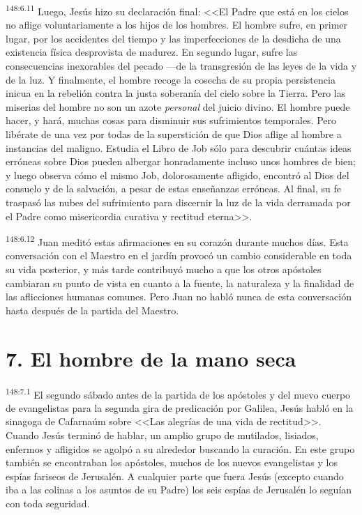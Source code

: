 \par 
\textsuperscript{148:6.11} Luego, Jesús hizo su declaración final: <<El Padre que está en los cielos no aflige voluntariamente a los hijos de los hombres. El hombre sufre, en primer lugar, por los accidentes del tiempo y las imperfecciones de la desdicha de una existencia física desprovista de madurez. En segundo lugar, sufre las consecuencias inexorables del pecado ---de la transgresión de las leyes de la vida y de la luz. Y finalmente, el hombre recoge la cosecha de su propia persistencia inicua en la rebelión contra la justa soberanía del cielo sobre la Tierra. Pero las miserias del hombre no son un azote \textit{personal} del juicio divino. El hombre puede hacer, y hará, muchas cosas para disminuir sus sufrimientos temporales. Pero libérate de una vez por todas de la superstición de que Dios aflige al hombre a instancias del maligno. Estudia el Libro de Job sólo para descubrir cuántas ideas erróneas sobre Dios pueden albergar honradamente incluso unos hombres de bien; y luego observa cómo el mismo Job, dolorosamente afligido, encontró al Dios del consuelo y de la salvación, a pesar de estas enseñanzas erróneas. Al final, su fe traspasó las nubes del sufrimiento para discernir la luz de la vida derramada por el Padre como misericordia curativa y rectitud eterna>>.

\par 
\textsuperscript{148:6.12} Juan meditó estas afirmaciones en su corazón durante muchos días. Esta conversación con el Maestro en el jardín provocó un cambio considerable en toda su vida posterior, y más tarde contribuyó mucho a que los otros apóstoles cambiaran su punto de vista en cuanto a la fuente, la naturaleza y la finalidad de las aflicciones humanas comunes. Pero Juan no habló nunca de esta conversación hasta después de la partida del Maestro.

\section*{7. El hombre de la mano seca}
\par 
\textsuperscript{148:7.1} El segundo sábado antes de la partida de los apóstoles y del nuevo cuerpo de evangelistas para la segunda gira de predicación por Galilea, Jesús habló en la sinagoga de Cafarnaúm sobre <<Las alegrías de una vida de rectitud>>. Cuando Jesús terminó de hablar, un amplio grupo de mutilados, lisiados, enfermos y afligidos se agolpó a su alrededor buscando la curación. En este grupo también se encontraban los apóstoles, muchos de los nuevos evangelistas y los espías fariseos de Jerusalén. A cualquier parte que fuera Jesús (excepto cuando iba a las colinas a los asuntos de su Padre) los seis espías de Jerusalén lo seguían con toda seguridad.

